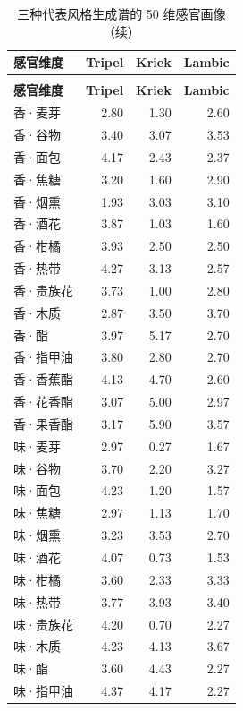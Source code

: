 \documentclass[zihao=-4,a4paper,UTF8,fontset=none]{ctexart}
\begin{document}
\begin{longtable}{@{}p{3.2cm}rrr@{}}
\caption{三种代表风格生成谱的 50 维感官画像（均值，0--6 级）}\\
\toprule
\textbf{感官维度} & \textbf{Tripel} & \textbf{Kriek} & \textbf{Lambic} \\ \midrule
\endfirsthead
\caption*{三种代表风格生成谱的 50 维感官画像（续）}\\
\toprule
\textbf{感官维度} & \textbf{Tripel} & \textbf{Kriek} & \textbf{Lambic} \\ \midrule
\endhead
\bottomrule
\endlastfoot
香·麦芽 & 2.80 & 1.30 & 2.60 \\
香·谷物 & 3.40 & 3.07 & 3.53 \\
香·面包 & 4.17 & 2.43 & 2.37 \\
香·焦糖 & 3.20 & 1.60 & 2.90 \\
香·烟熏 & 1.93 & 3.03 & 3.10 \\
香·酒花 & 3.87 & 1.03 & 1.60 \\
香·柑橘 & 3.93 & 2.50 & 2.50 \\
香·热带 & 4.27 & 3.13 & 2.57 \\
香·贵族花 & 3.73 & 1.00 & 2.80 \\
香·木质 & 2.87 & 3.50 & 3.70 \\
香·酯 & 3.97 & 5.17 & 2.70 \\
香·指甲油 & 3.80 & 2.80 & 2.70 \\
香·香蕉酯 & 4.13 & 4.70 & 2.60 \\
香·花香酯 & 3.07 & 5.00 & 2.97 \\
香·果香酯 & 3.17 & 5.90 & 3.57 \\
味·麦芽 & 2.97 & 0.27 & 1.67 \\
味·谷物 & 3.70 & 2.20 & 3.27 \\
味·面包 & 4.23 & 1.20 & 1.57 \\
味·焦糖 & 2.97 & 1.13 & 1.70 \\
味·烟熏 & 3.23 & 3.53 & 2.70 \\
味·酒花 & 4.07 & 0.73 & 1.53 \\
味·柑橘 & 3.60 & 2.33 & 3.33 \\
味·热带 & 3.77 & 3.93 & 3.40 \\
味·贵族花 & 4.20 & 0.70 & 2.27 \\
味·木质 & 4.23 & 4.13 & 3.67 \\
味·酯 & 3.60 & 4.43 & 2.27 \\
味·指甲油 & 4.37 & 4.17 & 2.27 \\

\end{longtable}
\end{document}
